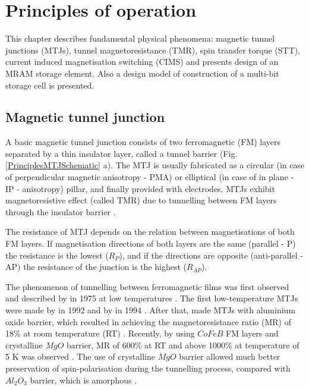 \chapter{Principles of operation}
\label{sec:Principles}

This chapter describes fundamental physical phenomena: magnetic tunnel junctions (MTJs), tunnel magnetoresistance (TMR), spin transfer torque (STT), current induced magnetisation switching (CIMS) and presents design of an MRAM storage element. Also a design model of construction of a multi-bit storage cell is presented.

\section{Magnetic tunnel junction} \label{sec:PrinciplesMTJ}
    A basic magnetic tunnel junction consists of two ferromagnetic (FM) layers separated by a thin insulator layer, called a tunnel barrier (Fig. \ref{PrinciplesMTJSchematic} a). The MTJ is usually fabricated as a circular (in case of perpendicular magnetic anisotropy - PMA) or elliptical (in case of in plane - IP - anisotropy) pillar, and finally provided with electrodes. MTJs exhibit magnetoresistive effect (called TMR) due to tunnelling between FM layers through the insulator barrier \cite{yuasa2007giant, stobiecki2012urzadzenia}.
    
    The resistance of MTJ depends on the relation between magnetisations of both FM layers. If magnetisation directions of both layers are the same (parallel - P) the resistance is the lowest ($R_{P}$), and if the directions are opposite (anti-parallel - AP) the resistance of the junction is the highest ($R_{AP}$).
    
    The phenomenon of tunnelling between ferromagnetic films was first observed and described by \citeauthor{julliere1975tunneling} in 1975 at low temperatures \cite{julliere1975tunneling}. The first low-temperature MTJs were made by \citeauthor{nowak1992spin} in 1992 and by \citeauthor{moodera1995large} in 1994 \cite{nowak1992spin,moodera1995large}. After that, \citeauthor{miyazaki1995giant} made MTJs with aluminium oxide barrier, which resulted in achieving the magnetoresistance ratio (MR) of 18\% at room temperature (RT) \cite{miyazaki1995giant}. Recently, by using $CoFeB$ FM layers and crystalline $MgO$ barrier, MR of 600\% at RT and above 1000\% at temperature of 5 K was observed \cite{ikeda2008tunnel}. The use of crystalline $MgO$ barrier allowed much better preservation of spin-polarisation during the tunnelling process, compared with $Al_2O_3$ barrier, which is amorphous \cite{harder2016electrical}. 
    
